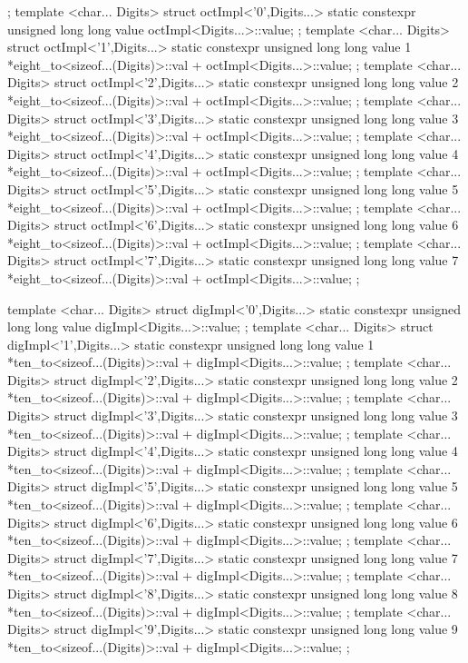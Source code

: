 \documentclass[ebook,11pt,article]{memoir}
\begin{document}
\begin{codeblock}
{{{{{};
template <char... Digits>
struct octImpl<'0',Digits...>{
	static constexpr unsigned long long value{ octImpl<Digits...>::value};
};
template <char... Digits>
struct octImpl<'1',Digits...>{
	static constexpr unsigned long long value{ 1 *eight_to<sizeof...(Digits)>::val 
						   + octImpl<Digits...>::value};
};
template <char... Digits>
struct octImpl<'2',Digits...>{
	static constexpr unsigned long long value{ 2 *eight_to<sizeof...(Digits)>::val 
						   + octImpl<Digits...>::value};
};
template <char... Digits>
struct octImpl<'3',Digits...>{
	static constexpr unsigned long long value{ 3 *eight_to<sizeof...(Digits)>::val 
						   + octImpl<Digits...>::value};
};
template <char... Digits>
struct octImpl<'4',Digits...>{
	static constexpr unsigned long long value{ 4 *eight_to<sizeof...(Digits)>::val 
						    + octImpl<Digits...>::value};
};
template <char... Digits>
struct octImpl<'5',Digits...>{
	static constexpr unsigned long long value{ 5 *eight_to<sizeof...(Digits)>::val 
						    + octImpl<Digits...>::value};
};
template <char... Digits>
struct octImpl<'6',Digits...>{
	static constexpr unsigned long long value{ 6 *eight_to<sizeof...(Digits)>::val 
						    + octImpl<Digits...>::value};
};
template <char... Digits>
struct octImpl<'7',Digits...>{
	static constexpr unsigned long long value{ 7 *eight_to<sizeof...(Digits)>::val
						    + octImpl<Digits...>::value};
};

template <char... Digits>
struct digImpl<'0',Digits...>{
	static constexpr unsigned long long value{ digImpl<Digits...>::value};
};
template <char... Digits>
struct digImpl<'1',Digits...>{
	static constexpr unsigned long long value{ 1 *ten_to<sizeof...(Digits)>::val
						    + digImpl<Digits...>::value};
};
template <char... Digits>
struct digImpl<'2',Digits...>{
	static constexpr unsigned long long value{ 2 *ten_to<sizeof...(Digits)>::val
						    + digImpl<Digits...>::value};
};
template <char... Digits>
struct digImpl<'3',Digits...>{
	static constexpr unsigned long long value{ 3 *ten_to<sizeof...(Digits)>::val
						    + digImpl<Digits...>::value};
};
template <char... Digits>
struct digImpl<'4',Digits...>{
	static constexpr unsigned long long value{ 4 *ten_to<sizeof...(Digits)>::val
						    + digImpl<Digits...>::value};
};
template <char... Digits>
struct digImpl<'5',Digits...>{
	static constexpr unsigned long long value{ 5 *ten_to<sizeof...(Digits)>::val
						    + digImpl<Digits...>::value};
};
template <char... Digits>
struct digImpl<'6',Digits...>{
	static constexpr unsigned long long value{ 6 *ten_to<sizeof...(Digits)>::val
						    + digImpl<Digits...>::value};
};
template <char... Digits>
struct digImpl<'7',Digits...>{
	static constexpr unsigned long long value{ 7 *ten_to<sizeof...(Digits)>::val
						    + digImpl<Digits...>::value};
};
template <char... Digits>
struct digImpl<'8',Digits...>{
	static constexpr unsigned long long value{ 8 *ten_to<sizeof...(Digits)>::val
						    + digImpl<Digits...>::value};
};
template <char... Digits>
struct digImpl<'9',Digits...>{
	static constexpr unsigned long long value{ 9 *ten_to<sizeof...(Digits)>::val
						    + digImpl<Digits...>::value};
};

}}}}
\end{codeblock}
\end{document}
